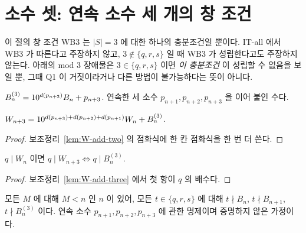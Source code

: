 \section{소수 셋: 연속 소수 세 개의 창 조건}

이 절의 창 조건 WB3 는 \(|S| = 3\) 에 대한 하나의 충분조건일 뿐이다. IT-all 에서 WB3 가 따른다고 주장하지 않고,
\(3 \notin \{q, r, s\}\) 일 때 WB3 가 성립한다고도 주장하지 않는다. 아래의 mod 3 장애물은
\(3 \in \{q, r, s\}\) 이면 \emph{이 충분조건} 이 성립할 수 없음을 보일 뿐, 그때 Q1 이 거짓이라거나
다른 방법이 불가능하다는 뜻이 아니다.

\begin{definition}[세 소수 블록]
  \label{def:B3}
  \leanok
  \(B^{(3)}_n = 10^{d(p_{n+3})} B_n + p_{n+3}\). 연속한 세 소수 \(p_{n+1}, p_{n+2}, p_{n+3}\) 을 이어 붙인 수다.
\end{definition}

\begin{lemma}[세 칸 점화식]
  \label{lem:W-add-three}
  \leanok
  \(W_{n+3} = 10^{d(p_{n+3}) + d(p_{n+2}) + d(p_{n+1})} W_n + B^{(3)}_n\).
\end{lemma}
\begin{proof}
  \leanok
  보조정리~\ref{lem:W-add-two} 의 점화식에 한 칸 점화식을 한 번 더 쓴다.
\end{proof}

\begin{lemma}[세 칸 가분성]
  \label{lem:dvd-add-three}
  \leanok
  \(q \mid W_n\) 이면 \(q \mid W_{n+3} \iff q \mid B^{(3)}_n\).
\end{lemma}
\begin{proof}
  \leanok
  보조정리~\ref{lem:W-add-three} 에서 첫 항이 \(q\) 의 배수다.
\end{proof}

\begin{definition}[가정 WB3(\(q, r, s\))]
  \label{def:WB3}
  \leanok
  모든 \(M\) 에 대해 \(M < n\) 인 \(n\) 이 있어, 모든 \(t \in \{q, r, s\}\) 에 대해
  \(t \nmid B_n\), \(t \nmid B_{n+1}\), \(t \nmid B^{(3)}_n\) 이다.
  연속 소수 \(p_{n+1}, p_{n+2}, p_{n+3}\) 에 관한 명제이며 증명하지 않은 가정이다.
\end{definition}

